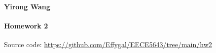 \documentclass[11pt]{article}
\theoremstyle{definition}
\begin{document}
\renewcommand{\labelenumii}{{\bfseries \em \arabic{enumi}.\arabic{enumii}}}
\newcommand{\problemitem}{\renewcommand{\labelenumi}{{\bfseries \em Problem \arabic{enumi}}}\item}
\newcommand{\solutionitem}{\renewcommand{\labelenumi}{{\bfseries \em Solution \arabic{enumi}}}\addtocounter{enumi}{-1}\item}
\newenvironment{solution}{\par\color{DarkBlue}}{\par}
{\noindent \textbf{Yirong Wang} }

\paragraph{Homework 2}


Source code: \url{https://github.com/Effygal/EECE5643/tree/main/hw2}
\end{document}
